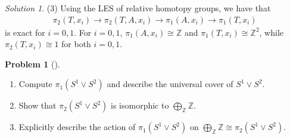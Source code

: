 \documentclass[reqno]{amsart}
\theoremstyle{definition}
\newtheorem{problem}[theorem]{Problem}
\theoremstyle{remark}
\newtheorem*{solution}{Solution}
\begin{document}
\begin{solution}
        (3) Using the LES of relative homotopy groups, we
        have that
        \begin{align*}
            \pi_2 (T,x_i)
            \to \pi_2 \left( T,A, x_i \right) 
            \to \pi_1 \left( A,x_i \right) \to 
            \pi_1 \left( T,x_i \right) 
        \end{align*}
        is exact for $i = 0,1$.
        For $i=0,1$, 
        $\pi_1 (A,x_i) \cong \mathbb{Z}$ and
        $\pi_1 (T,x_i) \cong \mathbb{Z}^2$, while
        $\pi_2 \left( T,x_i \right) \cong 1$ for
        both $i=0,1$.
    \end{solution}


    \begin{problem}[]
        \begin{enumerate}
            \item Compute $\pi_1 \left( S^{1} \vee
                S^2\right) $ and describe the universal
                cover of $S^{1} \vee S^2$.
            \item Show that $\pi_2 \left( S^{1} \vee
                S^2 \right) $ is isomorphic
                to $\bigoplus_{\mathbb{Z}} \mathbb{Z}$.
            \item Explicitly describe the action of
                $\pi_1 \left( S^{1} \vee S^2 \right) $ on
                $\bigoplus_{\mathbb{Z}} \mathbb{Z} \cong
                \pi_2 \left( S^{1} \vee S^2 \right) $.
        \end{enumerate}
    \end{problem}
\end{document}
